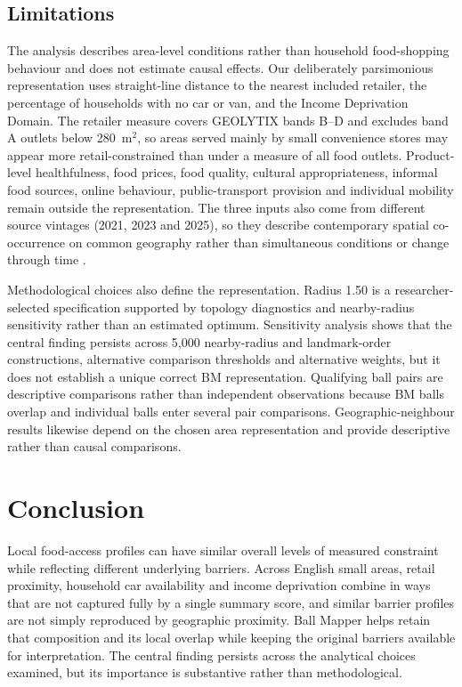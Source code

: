 \documentclass[11pt,a4paper]{article}
\begin{document}
\subsection{Limitations}
The analysis describes area-level conditions rather than household food-shopping behaviour and does not estimate causal effects. Our deliberately parsimonious representation uses straight-line distance to the nearest included retailer, the percentage of households with no car or van, and the Income Deprivation Domain. The retailer measure covers GEOLYTIX bands B--D and excludes band A outlets below 280~m$^2$, so areas served mainly by small convenience stores may appear more retail-constrained than under a measure of all food outlets. Product-level healthfulness, food prices, food quality, cultural appropriateness, informal food sources, online behaviour, public-transport provision and individual mobility remain outside the representation. The three inputs also come from different source vintages (2021, 2023 and 2025), so they describe contemporary spatial co-occurrence on common geography rather than simultaneous conditions or change through time \citep{Dong2025,Titis2022}.

Methodological choices also define the representation. Radius 1.50 is a researcher-selected specification supported by topology diagnostics and nearby-radius sensitivity rather than an estimated optimum. Sensitivity analysis shows that the central finding persists across 5,000 nearby-radius and landmark-order constructions, alternative comparison thresholds and alternative weights, but it does not establish a unique correct BM representation. Qualifying ball pairs are descriptive comparisons rather than independent observations because BM balls overlap and individual balls enter several pair comparisons. Geographic-neighbour results likewise depend on the chosen area representation and provide descriptive rather than causal comparisons.

\section{Conclusion}
Local food-access profiles can have similar overall levels of measured constraint while reflecting different underlying barriers. Across English small areas, retail proximity, household car availability and income deprivation combine in ways that are not captured fully by a single summary score, and similar barrier profiles are not simply reproduced by geographic proximity. Ball Mapper helps retain that composition and its local overlap while keeping the original barriers available for interpretation. The central finding persists across the analytical choices examined, but its importance is substantive rather than methodological.
\end{document}
